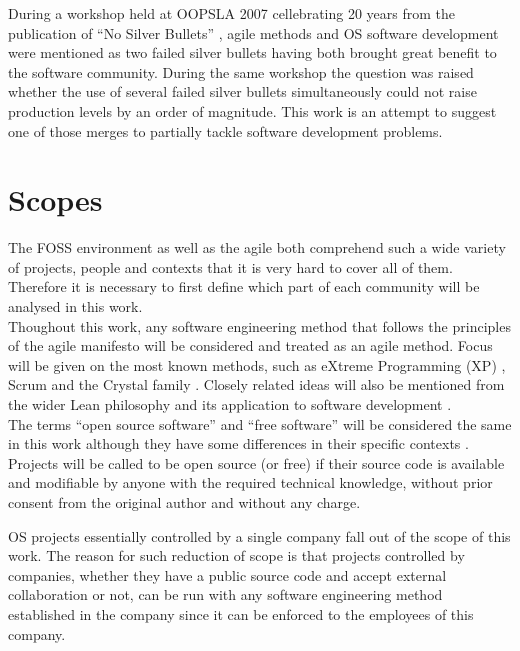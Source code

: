 \documentclass[lnbip]{svmultln}
\begin{document}
During a workshop \cite{conference:oopsla2007} held at OOPSLA 2007
cellebrating 20 years from the publication of ``No Silver Bullets''
\cite{brooks1987}, agile methods and OS software development were
mentioned as two failed silver bullets having both brought great
benefit to the software community. During the same workshop the
question was raised whether the use of several failed silver bullets
simultaneously could not raise production levels by an order of
magnitude. This work is an attempt to suggest one of those merges to
partially tackle software development problems.


\section{Scopes}
\label{sec:scope}

The FOSS environment as well as the agile both comprehend such a wide
variety of projects, people and contexts that it is very hard to cover
all of them. Therefore it is necessary to first define which part of
each community will be analysed in this work.
\\

Thoughout this work, any software engineering method that follows the
principles of the agile manifesto \cite{url:agilemanifesto} will be
considered and treated as an agile method. Focus will be given on the
most known methods, such as eXtreme Programming (XP) \cite{XP2002},
Scrum \cite{schwaber2004} and the Crystal family
\cite{cockburn2002}. Closely related ideas will also be mentioned from
the wider Lean philosophy \cite{ohno1998} and its application to
software development \cite{poppendieck2005}.
\\

The terms ``open source software'' and ``free software'' will be
considered the same in this work although they have some differences
in their specific contexts \cite[Ch. 1, Free Versus Open
source]{fogel2005}. Projects will be called to be open source (or
free) if their source code is available and modifiable by anyone with
the required technical knowledge, without prior consent from the
original author and without any charge.

OS projects essentially controlled by a single company fall out of the
scope of this work. The reason for such reduction of scope is that
projects controlled by companies, whether they have a public source
code and accept external collaboration or not, can be run with any
software engineering method established in the company since it can be
enforced to the employees of this company.
\end{document}
